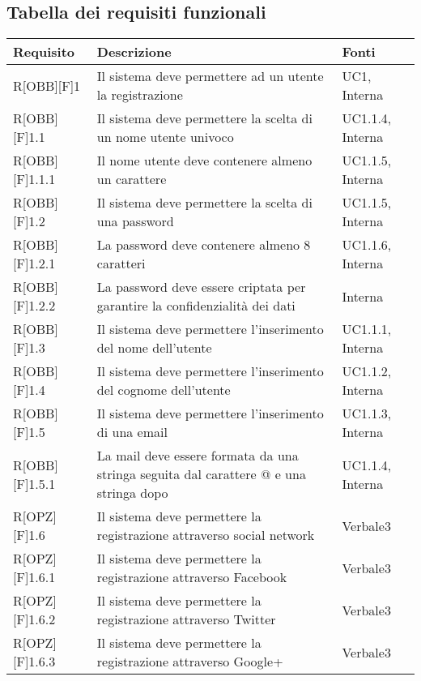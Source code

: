 \subsection{Tabella dei requisiti funzionali}
	\begin{table}[h]
		\begin{tabular}{|p{}|p{}|p{}|}
			\toprule
			
			\textbf{Requisito} & \textbf{Descrizione} & \textbf{Fonti} \\
			
			\midrule

R[OBB][F]1 & Il sistema deve permettere ad un utente la registrazione & UC1, Interna \\ \midrule
R[OBB][F]1.1 & Il sistema deve permettere la scelta di un nome utente univoco & UC1.1.4, Interna \\ \midrule
R[OBB][F]1.1.1 & Il nome utente deve contenere almeno un carattere & UC1.1.5, Interna \\ \midrule
R[OBB][F]1.2 & Il sistema deve permettere la scelta di una password & UC1.1.5, Interna \\ \midrule
R[OBB][F]1.2.1 & La password deve contenere almeno 8 caratteri & UC1.1.6, Interna \\ \midrule
R[OBB][F]1.2.2 & La password deve essere criptata per garantire la confidenzialità dei dati & Interna \\ \midrule
R[OBB][F]1.3 & Il sistema deve permettere l'inserimento del nome dell'utente & UC1.1.1, Interna \\ \midrule
R[OBB][F]1.4 & Il sistema deve permettere l'inserimento del cognome dell'utente & UC1.1.2, Interna \\ \midrule
R[OBB][F]1.5 & Il sistema deve permettere l'inserimento di una email & UC1.1.3, Interna \\ \midrule
R[OBB][F]1.5.1 & La mail deve essere formata da una stringa seguita dal carattere @ e una stringa dopo & UC1.1.4, Interna \\ \midrule
R[OPZ][F]1.6 & Il sistema deve permettere la registrazione attraverso social network & Verbale3 \\ \midrule
R[OPZ][F]1.6.1 & Il sistema deve permettere la registrazione attraverso \gls{Facebook} & Verbale3 \\ \midrule
R[OPZ][F]1.6.2 & Il sistema deve permettere la registrazione attraverso Twitter & Verbale3 \\ \midrule
R[OPZ][F]1.6.3 & Il sistema deve permettere la registrazione attraverso Google+ & Verbale3 \\ \midrule

\end{tabular}
\end{table}
